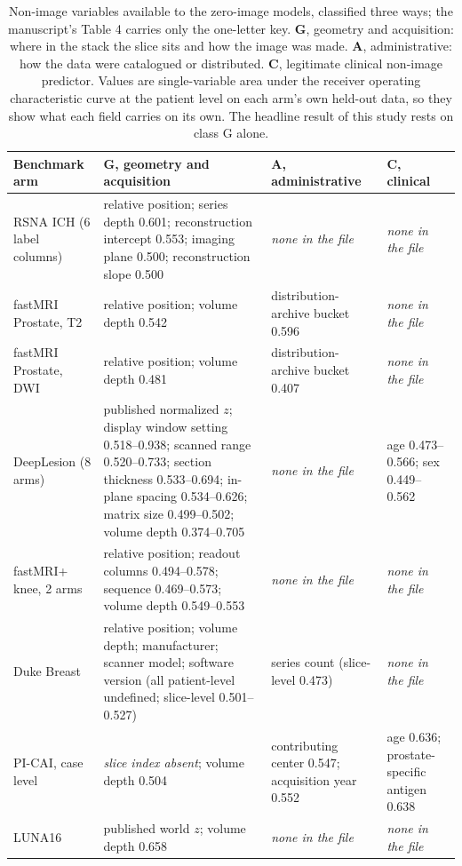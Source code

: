 \begin{table}[t]
\centering
\footnotesize
\caption{Non-image variables available to the zero-image models, classified three ways;
the manuscript's Table 4 carries only the one-letter key. \textbf{G}, geometry and acquisition: where in the stack the slice
sits and how the image was made. \textbf{A}, administrative: how the data were
catalogued or distributed. \textbf{C}, legitimate clinical non-image predictor.
Values are single-variable area under the receiver operating characteristic
curve at the patient level on each arm's own held-out data, so they show what
each field carries on its own. The headline result of this study rests on class
G alone.}
\label{tab:taxonomy}
\begin{tabular}{@{}p{} p{} p{} p{}@{}}
\toprule
Benchmark arm & G, geometry and acquisition & A, administrative & C, clinical \\
\midrule
RSNA ICH (6 label columns) & relative position; series depth 0.601; reconstruction intercept 0.553; imaging plane 0.500; reconstruction slope 0.500 & \emph{none in the file} & \emph{none in the file} \\
\addlinespace[2pt]
fastMRI Prostate, T2 & relative position; volume depth 0.542 & distribution-archive bucket 0.596 & \emph{none in the file} \\
fastMRI Prostate, DWI & relative position; volume depth 0.481 & distribution-archive bucket 0.407 & \emph{none in the file} \\
\addlinespace[2pt]
DeepLesion (8 arms) & published normalized $z$; display window setting 0.518--0.938; scanned range 0.520--0.733; section thickness 0.533--0.694; in-plane spacing 0.534--0.626; matrix size 0.499--0.502; volume depth 0.374--0.705 & \emph{none in the file} & age 0.473--0.566; sex 0.449--0.562 \\
\addlinespace[2pt]
fastMRI+ knee, 2 arms & relative position; readout columns 0.494--0.578; sequence 0.469--0.573; volume depth 0.549--0.553 & \emph{none in the file} & \emph{none in the file} \\
\addlinespace[2pt]
Duke Breast & relative position; volume depth; manufacturer; scanner model; software version (all patient-level undefined; slice-level 0.501--0.527) & series count (slice-level 0.473) & \emph{none in the file} \\
\addlinespace[2pt]
PI-CAI, case level & \emph{slice index absent}; volume depth 0.504 & contributing center 0.547; acquisition year 0.552 & age 0.636; prostate-specific antigen 0.638 \\
\addlinespace[2pt]
LUNA16 & published world $z$; volume depth 0.658 & \emph{none in the file} & \emph{none in the file} \\
\bottomrule
\end{tabular}


\end{table}
